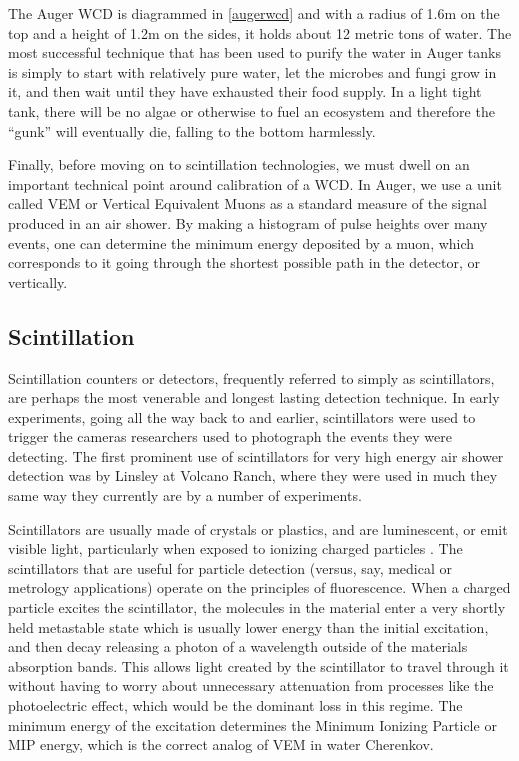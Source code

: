 The Auger WCD is diagrammed in \autoref{augerwcd} and with a radius of 1.6m on the top and a height of 1.2m on the sides, it holds about 12 metric tons of water. The most successful technique that has been used to purify the water in Auger tanks is simply to start with relatively pure water, let the microbes and fungi grow in it, and then wait until they have exhausted their food supply. In a light tight tank, there will be no algae or otherwise to fuel an ecosystem and therefore the ``gunk'' will eventually die, falling to the bottom harmlessly. 

Finally, before moving on to scintillation technologies, we must dwell on an important technical point around calibration of a WCD. In Auger, we use a unit called VEM or Vertical Equivalent Muons as a standard measure of the signal produced in an air shower. By making a histogram of pulse heights over many events, one can determine the minimum energy deposited by a muon, which corresponds to it going through the shortest possible path in the detector, or vertically. 
\subsection{Scintillation}
\label{scints}
Scintillation counters or detectors, frequently referred to simply as scintillators, are perhaps the most venerable and longest lasting detection technique. In early experiments, going all the way back to  and earlier, scintillators were used to trigger the cameras researchers used to photograph the events they were detecting. The first prominent use of scintillators for very high energy air shower detection was by Linsley at Volcano Ranch, where they were used in much they same way they currently are by a number of experiments. 

Scintillators are usually made of crystals or plastics, and are luminescent, or emit visible light, particularly when exposed to ionizing charged particles \cite{scints}. The scintillators that are useful for particle detection (versus, say, medical or metrology applications) operate on the principles of fluorescence. When a charged particle excites the scintillator, the molecules in the material enter a very shortly held metastable state which is usually lower energy than the initial excitation, and then decay releasing a photon of a wavelength outside of the materials absorption bands. This allows light created by the scintillator to travel through it without having to worry about unnecessary attenuation from processes like the photoelectric effect, which would be the dominant loss in this regime. The minimum energy of the excitation determines the Minimum Ionizing Particle or MIP energy, which is the correct analog of VEM in water Cherenkov.

